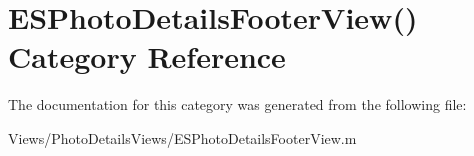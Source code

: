 \hypertarget{category_e_s_photo_details_footer_view_07_08}{}\section{E\+S\+Photo\+Details\+Footer\+View() Category Reference}
\label{category_e_s_photo_details_footer_view_07_08}


The documentation for this category was generated from the following file\+:\begin{DoxyCompactItemize}
\item 
Views/\+Photo\+Details\+Views/E\+S\+Photo\+Details\+Footer\+View.\+m\end{DoxyCompactItemize}
